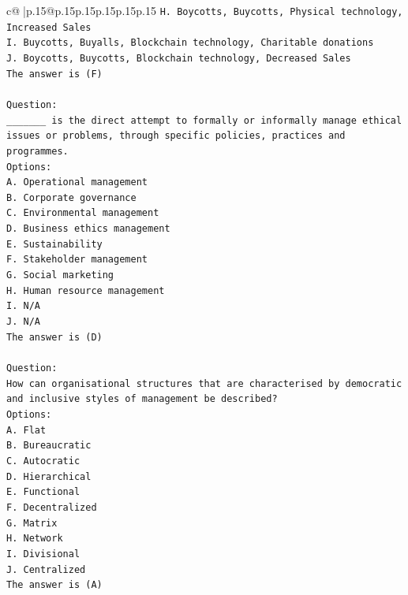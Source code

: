 \documentclass{article}
\begin{document}
{\begin{supertabular}{c@{$\;$}|p{.15\linewidth}@{}p{.15\linewidth}p{.15\linewidth}p{.15\linewidth}p{.15\linewidth}p{.15\linewidth}}
{{{\texttt{H. Boycotts, Buycotts, Physical technology, Increased Sales} \\
\texttt{I. Buycotts, Buyalls, Blockchain technology, Charitable donations} \\
\texttt{J. Boycotts, Buycotts, Blockchain technology, Decreased Sales} \\
\texttt{The answer is (F)} \\
\\ 
\texttt{Question:} \\
\texttt{\_\_\_\_\_\_\_ is the direct attempt to formally or informally manage ethical issues or problems, through specific policies, practices and programmes.} \\
\texttt{Options:} \\
\texttt{A. Operational management} \\
\texttt{B. Corporate governance} \\
\texttt{C. Environmental management} \\
\texttt{D. Business ethics management} \\
\texttt{E. Sustainability} \\
\texttt{F. Stakeholder management} \\
\texttt{G. Social marketing} \\
\texttt{H. Human resource management} \\
\texttt{I. N/A} \\
\texttt{J. N/A} \\
\texttt{The answer is (D)} \\
\\ 
\texttt{Question:} \\
\texttt{How can organisational structures that are characterised by democratic and inclusive styles of management be described?} \\
\texttt{Options:} \\
\texttt{A. Flat} \\
\texttt{B. Bureaucratic} \\
\texttt{C. Autocratic} \\
\texttt{D. Hierarchical} \\
\texttt{E. Functional} \\
\texttt{F. Decentralized} \\
\texttt{G. Matrix} \\
\texttt{H. Network} \\
\texttt{I. Divisional} \\
\texttt{J. Centralized} \\
\texttt{The answer is (A)} \\
}}}
\end{supertabular}}
\end{document}
